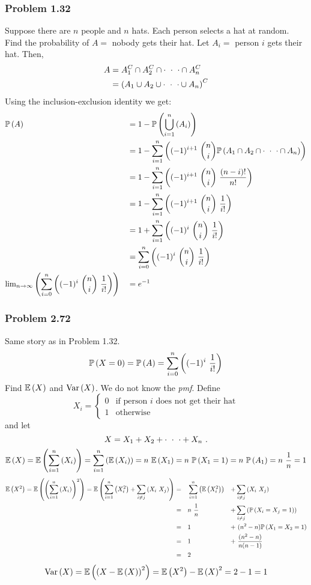 \documentclass{article}
\begin{document}
\subsubsection{Problem 1.32}
Suppose there are $n$ people and $n$ hats. Each person selects a hat at random. Find the probability of $A=$ nobody gets their hat. Let $A_i=$ person $i$ gets their hat. Then,
\begin{align*}
A&=A_1^C \cap A_2^C \cap \cdot\ \cdot\ \cdot \cap A_n^C \\
 &=\left(A_1 \cup A_2 \cup \cdot\ \cdot\ \cdot \cup A_n\right)^C
\end{align*}
Using the inclusion-exclusion identity we get:
\begin{align*}
&\prob{A}&&=1-\prob{\parunion{i=1}{n}{A_i}} \\
&		 &&=1-\parsum{i=1}{n}{(-1)^{i+1}\ \binom{n}{i}\prob{A_1\cap A_2\cap \midellipsis \cap A_n}} \\
&		 &&=1-\parsum{i=1}{n}{(-1)^{i+1}\ \binom{n}{i}\ \frac{(n-i)!}{n!}} \\
&		 &&=1-\parsum{i=1}{n}{(-1)^{i+1}\ \binom{n}{i}\ \frac{1}{i!}} \\
&		 &&=1+\parsum{i=1}{n}{(-1)^i\ \binom{n}{i}\ \frac{1}{i!}} \\
&		 &&=\parsum{i=0}{n}{(-1)^i\ \binom{n}{i}\ \frac{1}{i!}} \\
&\text{lim}_{n\rightarrow\infty}\left(\parsum{i=0}{n}{(-1)^i\ \binom{n}{i}\ \frac{1}{i!}}\right)&&=e^{-1}
\end{align*}

\subsubsection{Problem 2.72}
Same story as in Problem 1.32.
$$\prob{X=0}=\prob{A}=\parsum{i=0}{n}{(-1)^i\ \frac{1}{i!}}$$
Find $\mathbb{E}\left(X\right)$ and $\text{Var}\left(X\right)$. We do not know the \textit{pmf}.
Define
$$X_i=
	\begin{cases} 
	      0 & \text{if person }i\text{ does not get their hat} \\
	      1 & \text{otherwise}
	\end{cases}$$ and let
$$X=X_1+X_2+\cdot\ \cdot\ \cdot+X_n\ .$$
$$\expect{X}=\expect{\parsum{i=1}{n}{X_i}}=\parsum{i=1}{n}{\expect{X_i}}=n\ \expect{X_1}=n\ \prob{X_1=1}=n\ \prob{A_1}=n\ \frac{1}{n}=1$$
\begin{align*}
\expect{X^2}=\expect{\left(\parsum{i=1}{n}{X_i}\right)^2}=\expect{\parsum{i=1}{n}{X_i^2}+\parsum{i\neq j}{}{X_i\ X_j}}&=&&\parsum{i=1}{n}{\expect{X_i^2}}&+&\parsum{i\neq j}{}{X_i\ X_j} \\
	&=&&n\ \frac{1}{n}&+&\parsum{i\neq j}{}{\prob{X_i=X_j=1}} \\
	&=&&1			  &+&\ (n^2-n)\prob{X_1=X_2=1} \\
	&=&&1			  &+&\ \frac{(n^2-n)}{n(n-1)} \\
	&=&&2
\end{align*}
$$\text{Var}\left(X\right)=\mathbb{E}\left(\left(X-\mathbb{E}\left(X\right)\right)^2\right)=\mathbb{E}\left(X^2\right)-\mathbb{E}\left(X\right)^2=2-1=1$$
\end{document}
